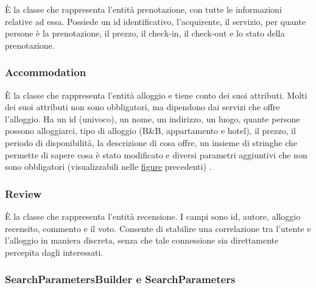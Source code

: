 \documentclass[10pt]{article}
\begin{document}
\`E la classe che rappresenta l'entit\`a prenotazione, con tutte le informazioni relative ad essa. Possiede un id identificativo, l'acquirente, il servizio, per quante persone \`e la prenotazione, il prezzo, il check-in, il check-out e lo stato della prenotazione.

\subsubsection{Accommodation}

\`E la classe che rappresenta l'entit\`a alloggio e tiene conto dei suoi attributi. Molti dei suoi attributi non sono obbligatori, ma dipendono dai servizi che offre l'alloggio. Ha un id (univoco), un nome, un indirizzo, un luogo, quante persone possono alloggiarci, tipo di alloggio (B\&B, appartamento e hotel), il prezzo, il periodo di disponibilit\`a, la descrizione di cosa offre, un insieme di stringhe che permette di sapere cosa \`e stato modificato e diversi parametri aggiuntivi che non sono obbligatori (visualizzabili nelle \hyperref[domainmodel]{figure} precedenti) .

\subsubsection{Review}

\`E la classe che rappresenta l'entit\`a recensione. I campi sono id, autore, alloggio recensito, commento e il voto. Consente di stabilire una correlazione tra l'utente e l'alloggio in maniera discreta, senza che tale connessione sia direttamente percepita dagli interessati.

\subsubsection{SearchParametersBuilder e SearchParameters}
\end{document}
